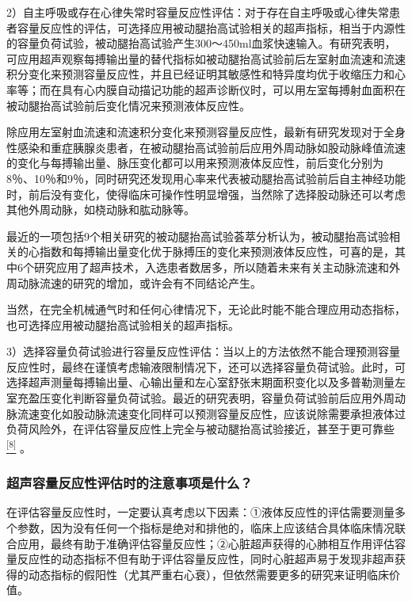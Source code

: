 2）自主呼吸或存在心律失常时容量反应性评估：对于存在自主呼吸或心律失常患者容量反应性的评估，可选择应用被动腿抬高试验相关的超声指标，相当于内源性的容量负荷试验，被动腿抬高试验产生300～450ml血浆快速输入。有研究表明，可应用超声观察每搏输出量的替代指标如被动腿抬高试验前后左室射血流速和流速积分变化来预测容量反应性，并且已经证明其敏感性和特异度均优于收缩压力和心率等；而在具有心内膜自动描记功能的超声诊断仪时，可以用左室每搏射血面积在被动腿抬高试验前后变化情况来预测液体反应性。

除应用左室射血流速和流速积分变化来预测容量反应性，最新有研究发现对于全身性感染和重症胰腺炎患者，在被动腿抬高试验前后应用外周动脉如股动脉峰值流速的变化与每搏输出量、脉压变化都可以用来预测液体反应性，前后变化分别为8％、10％和9％，同时研究还发现用心率来代表被动腿抬高试验前后自主神经功能时，前后没有变化，使得临床可操作性明显增强，当然除了选择股动脉还可以考虑其他外周动脉，如桡动脉和肱动脉等。

最近的一项包括9个相关研究的被动腿抬高试验荟萃分析认为，被动腿抬高试验相关的心指数和每搏输出量变化优于脉搏压的变化来预测液体反应性，可喜的是，其中6个研究应用了超声技术，入选患者数居多，所以随着未来有关主动脉流速和外周动脉流速的研究的增加，或许会有不同结论产生。

当然，在完全机械通气时和任何心律情况下，无论此时能不能合理应用动态指标，也可选择应用被动腿抬高试验相关的超声指标。

3）选择容量负荷试验进行容量反应性评估：当以上的方法依然不能合理预测容量反应性时，最终在谨慎考虑输液限制情况下，还可以选择容量负荷试验。此时，可选择超声测量每搏输出量、心输出量和左心室舒张末期面积变化以及多普勒测量左室充盈压变化判断容量负荷试验。最近的研究表明，容量负荷试验前后应用外周动脉流速变化如股动脉流速变化同样可以预测容量反应性，应该说除需要承担液体过负荷风险外，在评估容量反应性上完全与被动腿抬高试验接近，甚至于更可靠些
\protect\hyperlink{text00009.htmlux5cux23ch8-8}{\textsuperscript{{[}8{]}}}
。

\subsubsection{超声容量反应性评估时的注意事项是什么？}

在评估容量反应性时，一定要认真考虑以下因素：①液体反应性的评估需要测量多个参数，因为没有任何一个指标是绝对和排他的，临床上应该结合具体临床情况联合应用，最终有助于准确评估容量反应性；②心脏超声获得的心肺相互作用评估容量反应性的动态指标不但有助于评估容量反应性，同时心脏超声易于发现非超声获得的动态指标的假阳性（尤其严重右心衰），但依然需要更多的研究来证明临床价值。

